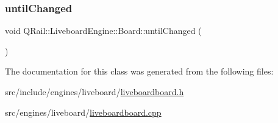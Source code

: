 \subsubsection{\texorpdfstring{untilChanged}{untilChanged}}
{\footnotesize\ttfamily void Q\+Rail\+::\+Liveboard\+Engine\+::\+Board\+::until\+Changed (\begin{DoxyParamCaption}{ }\end{DoxyParamCaption})\hspace{0.3cm}{\ttfamily [signal]}}



The documentation for this class was generated from the following files\+:\begin{DoxyCompactItemize}
\item 
src/include/engines/liveboard/\mbox{\hyperlink{liveboardboard_8h}{liveboardboard.\+h}}\item 
src/engines/liveboard/\mbox{\hyperlink{liveboardboard_8cpp}{liveboardboard.\+cpp}}\end{DoxyCompactItemize}
